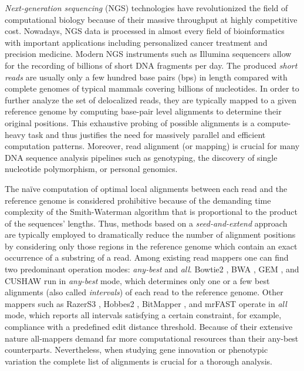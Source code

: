 \documentclass[conference]{IEEEtran}
\begin{document}
{\em Next-generation sequencing} (NGS) technologies have revolutionized the field of computational biology because of their massive throughput at highly competitive cost. Nowadays, NGS data is processed in almost every field of bioinformatics with important applications including personalized cancer treatment and precision medicine.
Modern NGS instruments such as Illumina sequencers \cite{reviewngs} allow for the recording of billions of short DNA fragments per day. The produced \emph{short reads} are usually only a few hundred base pairs (bps) in length compared with complete genomes of typical mammals covering billions of nucleotides. In order to further analyze the set of delocalized reads, they are typically mapped to a given reference genome by computing base-pair level alignments to determine their original positions. This exhaustive probing of possible alignments is a compute-heavy task and thus justifies the need for massively parallel and efficient computation patterns. Moreover, read alignment (or mapping) is crucial for many DNA sequence analysis pipelines such as genotyping, the discovery of single nucleotide polymorphism, or personal genomics.

The na\"ive computation of optimal local alignments between each read and the reference genome is considered prohibitive because of the demanding time complexity of the Smith-Waterman algorithm \cite{sw} that is proportional to the product of the sequences' lengths. Thus, methods based on a {\em seed-and-extend} approach are typically employed to dramatically reduce the number of alignment positions by considering only those regions in the reference genome which contain an exact occurrence of a substring of a read. Among existing read mappers one can find two predominant operation modes: {\em any-best} and {\em all}. Bowtie2 \cite{bowtie2}, BWA \cite{bwa}, GEM \cite{gem}, and CUSHAW \cite{cushaw} run in {\em any-best} mode, which determines only one or a few best alignments (also called {\em intervals}) of each read to the reference genome. Other mappers such as RazerS3 \cite{razers3}, Hobbes2 \cite{hobbes2}, BitMapper \cite{bitmapper}, and mrFAST \cite{mrfast} operate in {\em all} mode, which reports all intervals satisfying a certain constraint, for example, compliance with a predefined edit distance threshold.  Because of their extensive nature all-mappers demand far more computational resources than their any-best counterparts. Nevertheless, when studying gene innovation or phenotypic variation the complete list of alignments is crucial for a thorough analysis. 
\end{document}
